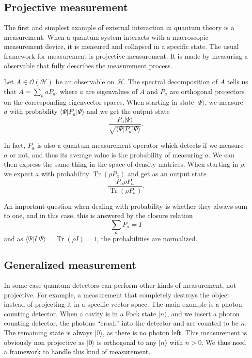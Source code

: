 \documentclass[10pt,a4paper]{report}
\theoremstyle{plain}
\theoremstyle{definition}
\theoremstyle{remark}
\newcommand{\ket}[1]{|#1\rangle}
\newcommand{\bra}[1]{\langle#1|}
\DeclareMathOperator{\Tr}{Tr}
\begin{document}
\subsection{Projective measurement}

The first and simplest example of external interaction in quantum theory is a
measurement. When a quantum system interacts with a macroscopic measurement
device, it is measured and collapsed in a specific state. The usual framework for
measurement is projective measurement. It is
made by measuring a observable that fully describes the measurement
process.

Let $A \in \mathcal{O}(\mathcal{H})$ be an observable on $\mathcal{H}$. The
spectral decomposition of $A$ tells us that $A = \sum_a a P_a$, where $a$
are eigenvalues of $A$ and $P_a$ are orthogonal projectors on the
corresponding eigenvector spaces. When starting in state $\ket \Psi$, we
measure $a$ with probability $\bra \Psi P_a \ket \Psi$ and we get
the output state
\[ \frac{P_a \ket \Psi}{\sqrt{\bra \Psi P_a \ket \Psi}}.\]

In fact, $P_a$ is also a quantum measurement operator which detects if we measure
$a$ or not, and thus its average value is the probability of measuring $a$. We
can then express the same thing in the space of density matrices. When starting in
$\rho$, we expect $a$ with probability $\Tr(\rho P_a)$ and get as an output
state
\[ \frac{P_a \rho P_a}{\Tr(\rho P_a)}.\]

An important question when dealing with probability is whether they always sum to
one, and in this case, this is answered by the closure relation
\[\sum_a P_a = I\]
and as $\bra \Psi I \ket \Psi = \Tr(\rho I) = 1$, the probabilities are normalized.

\subsection{Generalized measurement}

In some case quantum detectors can perform other kinds of measurement, not projective.
For example, a measurement that completely destroys the object instead of
projecting it in a specific vector space. The main example is a photon counting
detector. When a cavity is in a Fock state $\ket n$, and we insert a photon
counting detector, the photons ``crash'' into the detector and are counted to be
$n$. The remaining state is always $\ket 0$, as there is no photon left. This
measurement is obviously non projective as $\ket 0$ is orthogonal to any $\ket
n$ with $n>0$. We thus need a framework to handle this kind of measurement.
\end{document}
